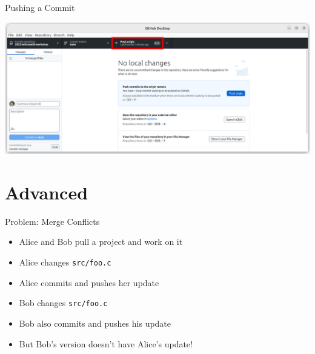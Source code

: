 \documentclass[compress,aspectratio=169]{beamer}
\begin{document}
  \begin{frame}{Pushing a Commit}
    \begin{center}
      \includegraphics[height=0.75\textheight]{./assets/GH_03.png}
    \end{center}
  \end{frame}

	\section{Advanced}

	\begin{frame}{Problem: Merge Conflicts}
		\begin{itemize}
			\item Alice and Bob pull a project and work on it
        \pause
      \item Alice changes \texttt{src/foo.c}
        \pause
      \item Alice commits and pushes her update
        \pause
      \item Bob changes \texttt{src/foo.c}
        \pause
      \item Bob also commits and pushes his update
        \pause
      \item But Bob's version doesn't have Alice's update!
		\end{itemize}
	\end{frame}
\end{document}
